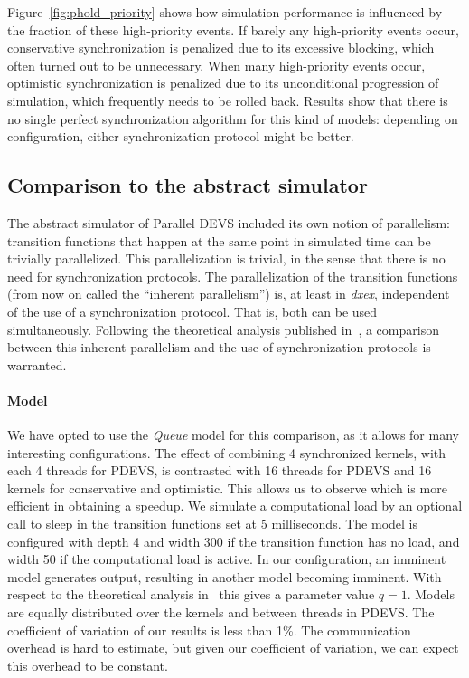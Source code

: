 Figure~\ref{fig:phold_priority} shows how simulation performance is influenced by the fraction of these high-priority events.
If barely any high-priority events occur, conservative synchronization is penalized due to its excessive blocking, which often turned out to be unnecessary.
When many high-priority events occur, optimistic synchronization is penalized due to its unconditional progression of simulation, which frequently needs to be rolled back.
Results show that there is no single perfect synchronization algorithm for this kind of models: depending on configuration, either synchronization protocol might be better.

\subsection{Comparison to the abstract simulator}
The abstract simulator of \textsf{Parallel DEVS} included its own notion of parallelism: transition functions that happen at the same point in simulated time can be trivially parallelized.
This parallelization is trivial, in the sense that there is no need for synchronization protocols.
The parallelization of the transition functions (from now on called the ``inherent parallelism'') is, at least in \textit{dxex}, independent of the use of a synchronization protocol.
That is, both can be used simultaneously.
Following the theoretical analysis published in~\cite{amdahlpdevs}, a comparison between this inherent parallelism and the use of synchronization protocols is warranted.

\paragraph{Model}
We have opted to use the \textit{Queue} model for this comparison, as it allows for many interesting configurations.
The effect of combining 4 synchronized kernels, with each 4 threads for PDEVS, is contrasted with 16 threads for PDEVS and 16 kernels for conservative and optimistic.
This allows us to observe which is more efficient in obtaining a speedup.
We simulate a computational load by an optional call to sleep in the transition functions set at 5 milliseconds.
The model is configured with depth 4 and width 300 if the transition function has no load, and width 50 if the computational load is active.
In our configuration, an imminent model generates output, resulting in another model becoming imminent.
With respect to the theoretical analysis in~\cite{amdahlpdevs} this gives a parameter value $q = 1$.
Models are equally distributed over the kernels and between threads in PDEVS.
The coefficient of variation of our results is less than 1\%.
The communication overhead is hard to estimate, but given our coefficient of variation, we can expect this overhead to be constant.


